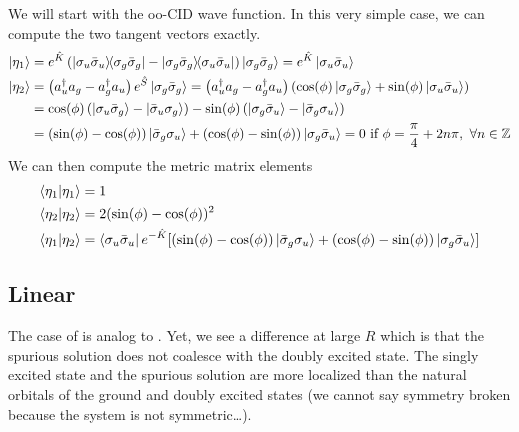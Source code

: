 \documentclass[11pt,a4paper]{article}
\newcommand{\hK}{\Hat{K}} %
\newcommand{\hS}{\Hat{S}}
\newcommand{\cre}[1]{a_{#1}^\dagger} %
\newcommand{\ani}[1]{a_{#1}} %
\begin{document}
We will start with the oo-CID wave function. In this very simple case, we can compute the two tangent vectors exactly.
\begin{align}
  \label{eq:H2_TangentVectors}
  \ket{\eta_1} &= e^{\hK} \left(\ketbra{\sigma_u\bar{\sigma}_u}{\sigma_g\bar{\sigma}_g} -\ketbra{\sigma_g\bar{\sigma}_g}{\sigma_u\bar{\sigma}_u}\right)\ket{\sigma_g\bar{\sigma}_g} = e^{\hK} \ket{\sigma_u\bar{\sigma}_u} \\
  \ket{\eta_2} &= \left(\cre{u}\ani{g} - \cre{g}\ani{u}\right)e^{\hS}\ket{\sigma_g\bar{\sigma}_g} = \left(\cre{u}\ani{g} - \cre{g}\ani{u}\right)\left(\cos(\phi)\ket{\sigma_g\bar{\sigma}_g} + \sin(\phi)\ket{\sigma_u\bar{\sigma}_u}\right) \\
               &= \cos(\phi)\left(\ket{\sigma_u\bar{\sigma}_g}-\ket{\bar{\sigma}_u\sigma_g}\right) - \sin(\phi)\left(\ket{\sigma_g\bar{\sigma}_u}-\ket{\bar{\sigma}_g\sigma_u}\right) \\
  &= \left(\sin(\phi)-\cos(\phi)\right)\ket{\bar{\sigma}_g\sigma_u} + \left(\cos(\phi)-\sin(\phi)\right)\ket{\sigma_g\bar{\sigma}_u} = 0~\text{if}~\phi = \frac{\pi}{4} + 2n\pi,~\forall n\in \mathbb{Z}
\end{align}
We can then compute the metric matrix elements
\begin{align}
  \braket{\eta_1}{\eta_1} &= 1 \\
  \braket{\eta_2}{\eta_2} &= 2(\sin(\phi)-\cos(\phi))^2 \\
  \braket{\eta_1}{\eta_2} &= \bra{\sigma_u\bar{\sigma}_u}e^{-\hK}\mleft[\left(\sin(\phi)-\cos(\phi)\right)\ket{\bar{\sigma}_g\sigma_u} + \left(\cos(\phi)-\sin(\phi)\right)\ket{\sigma_g\bar{\sigma}_u}\mright]
\end{align}

\subsection{Linear }

The case of  is analog to . Yet, we see a difference at large $R$ which is that the spurious solution does not coalesce with the doubly excited state.
The singly excited state and the spurious solution are more localized than the natural orbitals of the ground and doubly excited states (we cannot say symmetry broken because the system is not symmetric\dots). 
\end{document}
